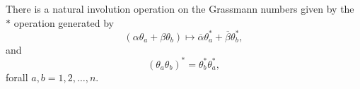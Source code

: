 \documentclass[prl,twocolumn,lengthcheck,superscriptaddress]{revtex4-1}
\theoremstyle{definition}
\theoremstyle{remark}
\begin{document}
There is a natural involution operation on the Grassmann numbers given by the $*$ operation generated by
\begin{equation}
	(\alpha\theta_a + \beta\theta_b) \mapsto \overline{\alpha}\theta_a^* + \overline{\beta}\theta_b^*,
\end{equation}
and 
\begin{equation}
	(\theta_a\theta_b)^* = \theta_b^*\theta_a^*,
\end{equation}
forall $a,b = 1, 2, \ldots, n$.
\end{document}
